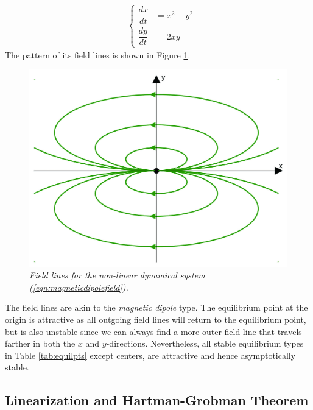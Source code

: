 \begin{align}
&\left\{\begin{alignedat}{1}
\dfrac{dx}{dt} &= x^2 - y^2 \\
\dfrac{dy}{dt} &= 2xy
\end{alignedat}\right. 
\label{eqn:magneticdipolefield}
\end{align}
The pattern of its field lines is shown in Figure \ref{fig:magneticdipolefield}. 
\begin{figure}
    \centering
    \includegraphics[scale=0.6]{graphics/dipolefield.jpg}
    \caption{\textit{Field lines for the non-linear dynamical system (\ref{eqn:magneticdipolefield}).}}
    \label{fig:magneticdipolefield}
\end{figure}
The field lines are akin to the \textit{magnetic dipole} type. The equilibrium point at the origin is attractive as all outgoing field lines will return to the equilibrium point, but is also unstable since we can always find a more outer field line that travels farther in both the $x$ and $y$-directions.\footnotemark{} Nevertheless, all stable equilibrium types in Table \ref{tab:equilpts} except centers, are attractive and hence asymptotically stable.

\subsection{Linearization and Hartman-Grobman Theorem}
\label{subsection:HGthm}

